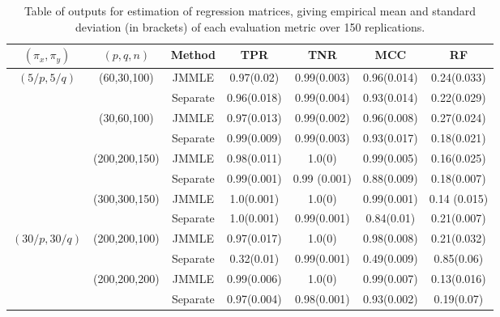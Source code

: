 \begin{scriptsize}
\begin{table}[t!]
    \begin{tabular}{ccccccc}
    \hline
    $(\pi_x, \pi_y)$ & $(p,q,n)$   & Method   & TPR            & TNR            & MCC & RF            \\ \hline
    $(5/p, 5/q)$   & (60,30,100)   & JMMLE    & 0.97(0.02)  & 0.99(0.003)  & 0.96(0.014) & 0.24(0.033) \\
    ~              & ~             & Separate & 0.96(0.018) & 0.99(0.004)  & 0.93(0.014) & 0.22(0.029) \\\cline{2-7}
    ~              & (30,60,100)   & JMMLE    & 0.97(0.013) & 0.99(0.002)  & 0.96(0.008) & 0.27(0.024) \\
    ~              & ~             & Separate & 0.99(0.009) & 0.99(0.003)  & 0.93(0.017) & 0.18(0.021) \\\cline{2-7}
    ~              & (200,200,150) & JMMLE    & 0.98(0.011) & 1.0(0)       & 0.99(0.005) & 0.16(0.025) \\
    ~              & ~             & Separate & 0.99(0.001) & 0.99 (0.001) & 0.88(0.009) & 0.18(0.007) \\\cline{2-7}
    ~              & (300,300,150) & JMMLE    & 1.0(0.001)  & 1.0(0)       & 0.99(0.001) & 0.14 (0.015)\\
    ~              & ~             & Separate & 1.0(0.001)  & 0.99(0.001)  & 0.84(0.01)  & 0.21(0.007)\\\hline
    $(30/p, 30/q)$ & (200,200,100) & JMMLE    & 0.97(0.017) & 1.0(0)       & 0.98(0.008) & 0.21(0.032) \\
    ~              & ~             & Separate & 0.32(0.01)  & 0.99(0.001)  & 0.49(0.009) & 0.85(0.06)  \\\cline{2-7}
    ~              & (200,200,200) & JMMLE    & 0.99(0.006) & 1.0(0)       & 0.99(0.007) & 0.13(0.016) \\
    ~              & ~             & Separate & 0.97(0.004) & 0.98(0.001)  & 0.93(0.002) & 0.19(0.07)  \\    \hline
    \end{tabular}
    \caption{Table of outputs for estimation of regression matrices, giving empirical mean and standard deviation (in brackets) of each evaluation metric over 150 replications.}
    \label{table:simtable11}
\end{table}


\end{scriptsize}
